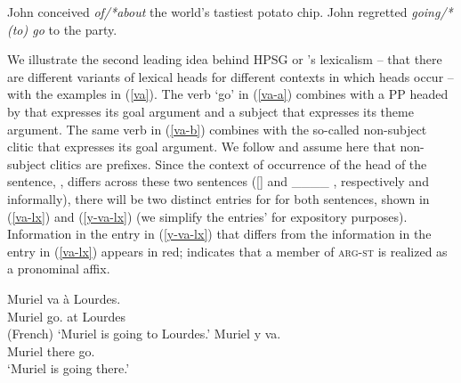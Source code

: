 \documentclass[output=paper
 	        ,biblatex
                ,babelshorthands
                ,newtxmath
                ,draftmode
                ,colorlinks, citecolor=brown
]{langscibook}
\begin{document}
\eal
\label{select}
\ex\label{select-a}John conceived \emph{of/*about} the world's tastiest potato chip.
\ex\label{select-b} John regretted \emph{going/*(to) go} to the party.
\zl


We illustrate the second leading idea behind HPSG or \lfg's lexicalism -- that there are different variants of lexical heads for different contexts in which heads occur -- with the  examples in (\ref{va}). The verb  `go' in (\ref{va-a}) combines with a PP headed by  that expresses its goal argument and a subject that expresses its theme argument. The same verb in (\ref{va-b}) combines with the so-called non-subject clitic  that expresses its goal argument. We follow \citet{MillerandSag1997} and assume here that  non-subject clitics are prefixes. Since the context of occurrence of the head of the sentence, , differs across these two sentences ([] and  \_\_\_\_ , respectively and informally), there will be two distinct entries for  for both sentences, shown in (\ref{va-lx}) and (\ref{y-va-lx}) (we simplify the entries'  for expository purposes). Information in the entry in (\ref{y-va-lx}) that differs from the information in the entry in (\ref{va-lx}) appears in red;  indicates that a member of \textsc{arg-st} is realized as a pronominal affix.

\eal
\label{va}
\ex\label{va-a} 
\gll Muriel va à Lourdes. \\
     Muriel go. at Lourdes \\\hfill(French)
     \glt `Muriel is going to Lourdes.'
\ex\label{va-b}
\gll Muriel y va. \\
     Muriel there go. \\
 \glt `Muriel is going there.'
\zl

\ea
\label{va-lx}
\z
\end{document}
